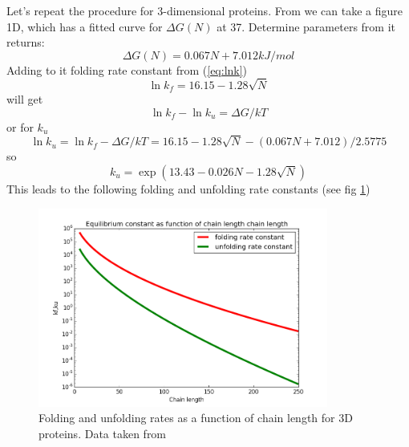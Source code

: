 \documentclass[12pt]{paper}
\newcommand{\gD}{\Delta}
\begin{document}
Let's repeat the procedure for 3-dimensional proteins.
From \cite{Dill2011} we can take a figure 1D, which has a fitted curve for $\gD G(N)$ at 
37\textcelsius. Determine parameters from it returns:
  \begin{equation}
   \gD G(N) = 0.067N+7.012 kJ/mol
  \end{equation} 
Adding to it folding rate constant from  (\ref{eq:lnk})
\begin{equation*}
    \ln k_f=16.15-1.28 \sqrt{N}
\end{equation*} 
will get
\begin{equation}
 \ln k_f-\ln k_u=\gD G/kT
\end{equation} 
or for $k_u$
\begin{equation}
 \ln k_u=\ln k_f-\gD G/kT= 16.15-1.28 \sqrt{N}-(0.067N+7.012 )/2.5775
\end{equation} 
so
\begin{equation}
 k_u = \exp(13.43 -0.026N - 1.28 \sqrt{N})
\end{equation} 
This leads to the following folding and unfolding rate constants (see fig \ref{fig:ku-kf-3D})
\begin{figure}[h!]
  \centering
  \includegraphics[width=0.85\textwidth]{pictures/kf-ku-3D.png} 
  \caption{Folding and unfolding rates as a function of chain length for 3D proteins. Data taken 
from \cite{Dill2011}}
  \label{fig:ku-kf-3D}
\end{figure}

  
  
\end{document}
